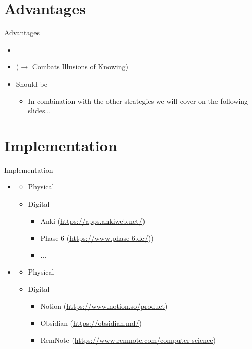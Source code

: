 \documentclass{ercisbeamer}
\begin{document}
\section{Advantages}
\begin{frame}{Advantages}

    \begin{itemize}
        \item {}
        \item {} ($\rightarrow$ Combats Illusions of Knowing)
        \vspace{1em}
        \item Should be 
        \begin{itemize}
            \item In combination with the other strategies we will cover on the following slides...
        \end{itemize}
    \end{itemize}
\end{frame}


\section{Implementation}
\begin{frame}{Implementation}
    \begin{itemize}
        \item {}
        \begin{itemize}
            \item Physical
            \item Digital
            \begin{itemize}
                \item Anki (\url{https://apps.ankiweb.net/})
                \item Phase 6 (\url{https://www.phase-6.de/}))
                \item ...
            \end{itemize}
        \end{itemize}
        \item {}
        \begin{itemize}
            \item Physical
            \item Digital 
            \begin{itemize}
                \item Notion (\url{https://www.notion.so/product})
                \item Obsidian (\url{https://obsidian.md/})
                \item RemNote (\url{https://www.remnote.com/computer-science})
            \end{itemize}
        \end{itemize}
    \end{itemize}
\end{frame}
\end{document}

